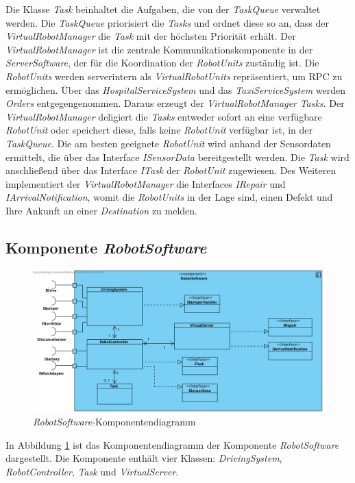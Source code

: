 Die Klasse \textit{Task} beinhaltet die Aufgaben, die von der \textit{TaskQueue} verwaltet werden. 
Die \textit{TaskQueue} priorisiert die \textit{Tasks} und ordnet diese so an, dass der \textit{VirtualRobotManager} die \textit{Task} mit der höchsten Priorität erhält. 
Der \textit{VirtualRobotManager} ist die zentrale Kommunikationskomponente in der \textit{ServerSoftware}, der für die Koordination der \textit{RobotUnits} zuständig ist. Die \textit{RobotUnits} werden serverintern als \textit{VirtualRobotUnits} repräsentiert, um RPC zu ermöglichen. Über das \textit{HospitalServiceSystem} und das \textit{TaxiServiceSystem} werden \textit{Orders} entgegengenommen. Daraus erzeugt der \textit{VirtualRobotManager} \textit{Tasks}. Der \textit{VirtualRobotManager} deligiert die \textit{Tasks} entweder sofort an eine verfügbare \textit{RobotUnit} oder speichert diese, falls keine \textit{RobotUnit} verfügbar ist, in der \textit{TaskQueue}. Die am besten geeignete \textit{RobotUnit} wird anhand der Sensordaten ermittelt, die über das Interface \textit{ISensorData} bereitgestellt werden. Die \textit{Task} wird anschließend über das Interface \textit{ITask} der \textit{RobotUnit} zugewiesen. Des Weiteren implementiert der \textit{VirtualRobotManager} die Interfaces \textit{IRepair} und \textit{IArrivalNotification}, womit die \textit{RobotUnits} in der Lage sind, einen Defekt und Ihre Ankunft an einer \textit{Destination} zu melden.
\subsection{Komponente \textit{RobotSoftware}}
\begin{figure}[H]
\centering
\includegraphics[width=1\textwidth]{img/2-Entwurf-5-RobotSoftware}
\caption{\emph{RobotSoftware}-Komponentendiagramm}
\label{KomponentenStruktur2}
\end{figure}
In Abbildung \ref{KomponentenStruktur2} ist das Komponentendiagramm der Komponente \textit{RobotSoftware} dargestellt. 
Die Komponente enthält vier Klassen: \textit{DrivingSystem}, \textit{RobotController}, \textit{Task} und \textit{VirtualServer}.

